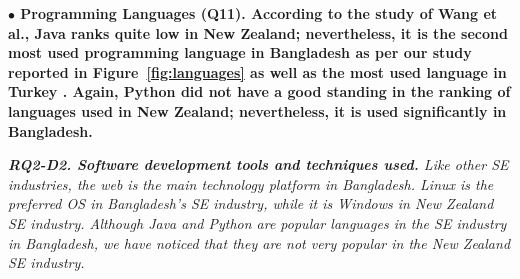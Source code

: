 \nd\bf{$\bullet$ Programming Languages (Q11).} According to the study of Wang et
al.\citep{Wang2018}, Java ranks quite low in New Zealand; nevertheless, it is
the second most used programming language in Bangladesh as per our study
reported in Figure~\ref{fig:languages} as well as the most used language in
Turkey \citep{Garousi2015}. Again, Python did not have a good standing in the
ranking of languages used in New Zealand; nevertheless, it is used significantly
in Bangladesh.

\begin{tcolorbox}[flushleft upper,boxrule=1pt,arc=0pt,left=0pt,right=0pt,top=0pt,bottom=0pt,colback=white,after=\ignorespacesafterend\par\noindent]
\nd\it{\bf{RQ2-D2. Software development tools and techniques used.}}
Like other SE industries, the web is the main technology platform in Bangladesh.
Linux is the preferred OS in Bangladesh's SE industry, while it is  Windows in 
New Zealand SE industry. Although Java and Python are popular languages in the
SE industry in Bangladesh, we have noticed that they are not very popular in the
New Zealand SE industry.
\end{tcolorbox}